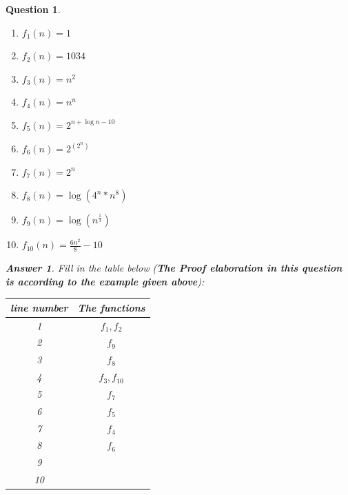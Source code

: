 \documentclass[a4paper]{article}
\theoremstyle{remarksStyle}
\theoremstyle{questionStyle}
\newtheorem{question}{Question}
\theoremstyle{answerStyle}
\newtheorem{answer}{Answer}
\begin{document}
\begin{question}
\begin{enumerate}
    \item $f_{1}(n) = 1$
    \item $f_{2}(n) = 1034$
    \item $f_{3}(n) = n^{2}$
    \item $f_{4}(n) = n^{n}$
    \item $f_{5}(n) = 2^{n + \log n - 10}$
    \item $f_{6}(n) = 2^{(2^{n})}$
    \item $f_{7}(n) = 2^{n}$
    \item $f_{8}(n) = \log{(4^{n}*n^{8})}$
    \item $f_{9}(n) = \log{(n^{\frac{1}{3}})}$
    \item $f_{10}(n) = \frac{6n^2}{8} - 10$
   
\end{enumerate}


\begin{answer}
    Fill in the table below (\textbf{The Proof elaboration in this question is according to the example given above}):
\end{answer}

\begin{center}
\begin{tabular}{||c | c ||} 
 \hline
 line number & The functions \\ [0.5ex] 
 \hline\hline
 1 & $f_1, f_2$ \\ 
 \hline
 2 & $f_9$ \\
 \hline
 3 & $ f_8 $\\
 \hline
 4 &  $ f_3, f_10$\\
 \hline
 5 & $ f_7 $\\
 \hline
 6 & $ f_5 $\\
 \hline
 7 & $ f_4 $\\
 \hline
 8 & $ f_6 $\\
 \hline
 9 & \\
 \hline
  10 & \\
 \hline
\end{tabular}
\end{center}
\end{question}
\end{document}
